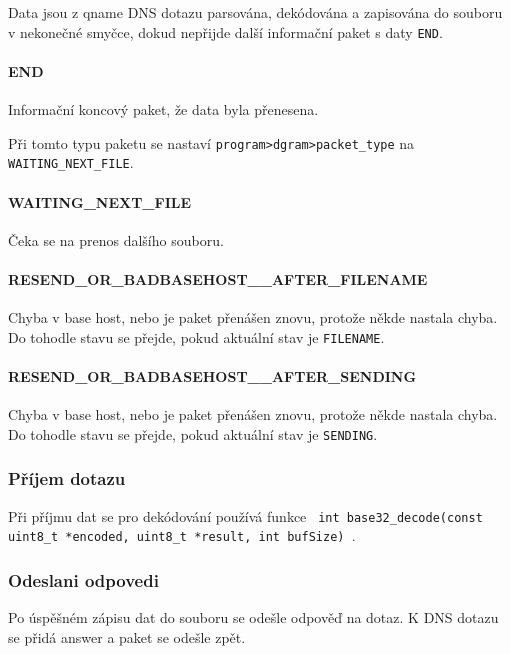 Data jsou z qname DNS dotazu parsována, dekódována a
zapisována do souboru v nekonečné smyčce, dokud nepřijde další
informační paket s daty \texttt{END}.

\paragraph{END}
Informační koncový paket, že data byla přenesena.

Při tomto typu paketu se nastaví \texttt{program\->dgram\->packet\_type} na \texttt{WAITING\_NEXT\_FILE}.

\paragraph{WAITING\_NEXT\_FILE}
Čeka se na prenos dalšího souboru.

\paragraph{RESEND\_OR\_BADBASEHOST\_\_AFTER\_FILENAME}
Chyba v base host, nebo je paket přenášen znovu, protože někde nastala chyba.
Do tohodle stavu se přejde, pokud aktuální stav je \texttt{FILENAME}.

\paragraph{RESEND\_OR\_BADBASEHOST\_\_AFTER\_SENDING}
Chyba v base host, nebo je paket přenášen znovu, protože někde nastala chyba.
Do tohodle stavu se přejde, pokud aktuální stav je \texttt{SENDING}.

\subsubsection{Příjem dotazu} \label{sec:odeslani-dotazu-s}
Při příjmu dat se pro dekódování používá funkce
\texttt{ int base32\_decode(const uint8\_t *encoded, uint8\_t *result, int bufSize) }\cite{encodingData}.

\subsubsection{Odeslani odpovedi}\label{sec:prijimani-odpovedi-s}
Po úspěšném zápisu dat do souboru se odešle odpověď na dotaz.
K DNS dotazu se přidá answer a paket se odešle zpět.
